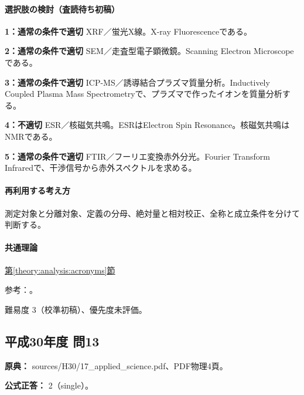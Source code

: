 \paragraph{選択肢の検討（査読待ち初稿）}\mbox{}\par

\noindent\textbf{1：通常の条件で適切} XRF／蛍光X線。X-ray Fluorescenceである。\par

\noindent\textbf{2：通常の条件で適切} SEM／走査型電子顕微鏡。Scanning Electron Microscopeである。\par

\noindent\textbf{3：通常の条件で適切} ICP-MS／誘導結合プラズマ質量分析。Inductively Coupled Plasma Mass Spectrometryで、プラズマで作ったイオンを質量分析する。\par

\noindent\textbf{4：不適切} ESR／核磁気共鳴。ESRはElectron Spin Resonance。核磁気共鳴はNMRである。\par

\noindent\textbf{5：通常の条件で適切} FTIR／フーリエ変換赤外分光。Fourier Transform Infraredで、干渉信号から赤外スペクトルを求める。\par

\paragraph{再利用する考え方} 測定対象と分離対象、定義の分母、絶対量と相対校正、全称と成立条件を分けて判断する。

\paragraph{共通理論} \hyperref[theory:analysis:acronyms]{第\ref*{theory:analysis:acronyms}節}

\par 参考：\cite{analysis49_esr_ref}。

\par 難易度 3（校準初稿）、優先度未評価。

\subsection{平成30年度 問13}
\label{q:h30-reg-applied-13}

\noindent\textbf{原典：} sources/H30/17\_applied\_science.pdf、PDF物理4頁。

\textbf{公式正答：} 2（single）。

